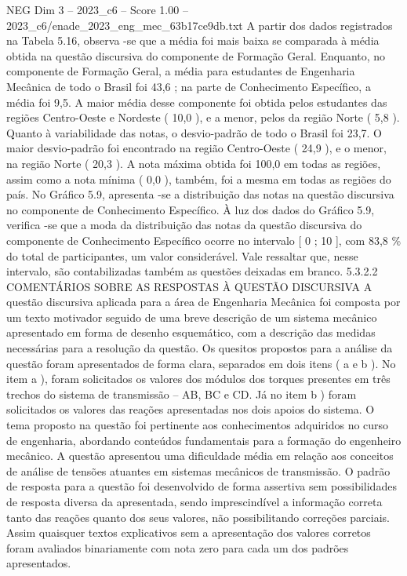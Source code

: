 \begin{textsample}{NEG Dim 3 – 2023\_c6 – Score 1.00 – 2023\_c6/enade\_2023\_eng\_mec\_63b17ce9db.txt}
A partir dos dados registrados na Tabela 5.16, observa -se que a média foi mais baixa se comparada à média obtida na questão discursiva do componente de Formação Geral.
Enquanto, no componente de Formação Geral, a média para estudantes de Engenharia Mecânica de todo o Brasil foi 43,6 ; na parte de Conhecimento Específico, a média foi 9,5.
A maior média desse componente foi obtida pelos estudantes das regiões Centro-Oeste e Nordeste ( 10,0 ), e a menor, pelos da região Norte ( 5,8 ).
Quanto à variabilidade das notas, o desvio-padrão de todo o Brasil foi 23,7.
O maior desvio-padrão foi encontrado na região Centro-Oeste ( 24,9 ), e o menor, na região Norte ( 20,3 ).
A nota máxima obtida foi 100,0 em todas as regiões, assim como a nota mínima ( 0,0 ), também, foi a mesma em todas as regiões do país.
No Gráfico 5.9, apresenta -se a distribuição das notas na questão discursiva no componente de Conhecimento Específico.
À luz dos dados do Gráfico 5.9, verifica -se que a moda da distribuição das notas da questão discursiva do componente de Conhecimento Específico ocorre no intervalo [ 0 ; 10 ], com 83,8 \% do total de participantes, um valor considerável.
Vale ressaltar que, nesse intervalo, são contabilizadas também as questões deixadas em branco. 5.3.2.2 COMENTÁRIOS SOBRE AS RESPOSTAS À QUESTÃO DISCURSIVA A questão discursiva aplicada para a área de Engenharia Mecânica foi composta por um texto motivador seguido de uma breve descrição de um sistema mecânico apresentado em forma de desenho esquemático, com a descrição das medidas necessárias para a resolução da questão.
Os quesitos propostos para a análise da questão foram apresentados de forma clara, separados em dois itens ( a e b ).
No item a ), foram solicitados os valores dos módulos dos torques presentes em três trechos do sistema de transmissão – AB, BC e CD.
Já no item b ) foram solicitados os valores das reações apresentadas nos dois apoios do sistema.
O tema proposto na questão foi pertinente aos conhecimentos adquiridos no curso de engenharia, abordando conteúdos fundamentais para a formação do engenheiro mecânico.
A questão apresentou uma dificuldade média em relação aos conceitos de análise de tensões atuantes em sistemas mecânicos de transmissão.
O padrão de resposta para a questão foi desenvolvido de forma assertiva sem possibilidades de resposta diversa da apresentada, sendo imprescindível a informação correta tanto das reações quanto dos seus valores, não possibilitando correções parciais.
Assim quaisquer textos explicativos sem a apresentação dos valores corretos foram avaliados binariamente com nota zero para cada um dos padrões apresentados.

\end{textsample}
